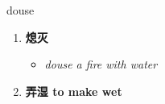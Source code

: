 
\begin{frame}
{\huge douse}
\begin{center}
\begin{enumerate}\Large
  \item \textbf{熄灭}
  \begin{itemize}
    \item \em{\Large{douse a fire with water}}
  \end{itemize}
  \item \textbf{弄湿 to make wet}
\end{enumerate}
\end{center}
\end{frame}
